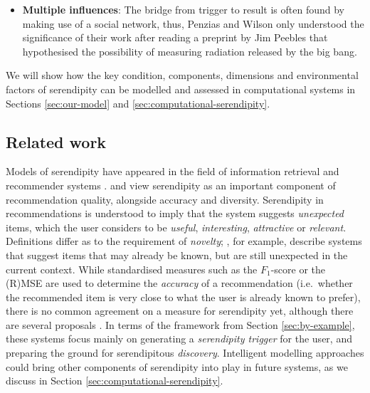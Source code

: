 \begin{itemize}
\item \textbf{Multiple influences}: The bridge from trigger to
  result is often found by making use of a social network, thus, 
  Penzias and Wilson only understood the significance of their work
  after reading a preprint by Jim Peebles that hypothesised the
  possibility of measuring radiation released by the big bang.
\end{itemize}

\noindent We will show how the key condition, components,
dimensions and environmental factors of serendipity can be modelled
and assessed in computational systems in Sections \ref{sec:our-model}
and \ref{sec:computational-serendipity}.

% 

\subsection{Related work} \label{sec:related}

Models of serendipity have appeared in the field of information retrieval \cite{foster2003serendipity} and recommender systems \cite{Toms2000}.   and  view serendipity as an important component of recommendation quality, alongside accuracy and diversity.  Serendipity in recommendations is
understood to imply that the system suggests \emph{unexpected} items, which the user considers to be \emph{useful}, \emph{interesting}, \emph{attractive} or \emph{relevant}. 
Definitions differ as to the requirement of \emph{novelty}; , for example, describe systems that suggest items that may already be known, but are still unexpected in the current context.  While standardised measures such as the $F_1$-score or the (R)MSE are used to determine the \emph{accuracy} of a recommendation (i.e.~whether the recommended item is very close to what the user is already known to prefer), there is no common agreement on a measure for serendipity yet, although there are several proposals
\cite{Murakami2008,Adamopoulos2011,McCay-Peet2011,iaquinta2010can}.
In terms of the framework from Section \ref{sec:by-example}, these systems focus mainly on generating a \emph{serendipity trigger} for the user, and preparing the ground for serendipitous \emph{discovery}.  Intelligent modelling approaches could bring other components of serendipity into play in future systems, as we discuss in Section \ref{sec:computational-serendipity}.

